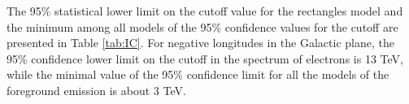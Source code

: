The 95\% statistical lower limit on the cutoff value for the rectangles model and the minimum among all models of the 95\% confidence values for the cutoff are presented in Table \ref{tab:IC}.
For negative longitudes in the Galactic plane,
the 95\% confidence lower limit on the cutoff in the spectrum of electrons is 13 TeV,
while the minimal value of the 95\% confidence limit for all the models of the foreground emission is about 3 TeV.

